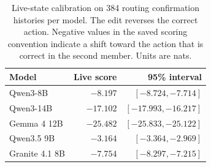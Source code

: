 \begin{table}[t]
\centering
\begin{tabular}{@{}lrr@{}}
\toprule
Model & Live score & 95\% interval \\
\midrule
Qwen3-8B & $-8.197$ & $[-8.724, -7.714]$ \\
Qwen3-14B & $-17.102$ & $[-17.993, -16.217]$ \\
Gemma 4 12B & $-25.482$ & $[-25.833, -25.122]$ \\
Qwen3.5 9B & $-3.164$ & $[-3.364, -2.969]$ \\
Granite 4.1 8B & $-7.754$ & $[-8.297, -7.215]$ \\
\bottomrule
\end{tabular}
\caption{Live-state calibration on 384 routing confirmation histories per model. The edit reverses the correct action. Negative values in the saved scoring convention indicate a shift toward the action that is correct in the second member. Units are nats.}
\label{tab:live}
\end{table}
